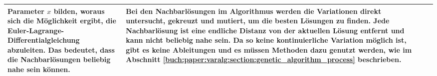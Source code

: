 \begin{xltabular}{\textwidth}{|L|X|X|}
   Parameter \(x\) bilden, woraus sich die Möglichkeit ergibt, die Euler-Lagrange-Differentialgleichung
   abzuleiten. Das bedeutet, dass die Nachbarlösungen beliebig nahe sein können.  
   & 
   Bei den Nachbarlösungen im Algorithmus werden die Variationen direkt untersucht,
   gekreuzt und mutiert, um die besten Lösungen zu finden. Jede Nachbarlösung 
   ist eine endliche Distanz von der aktuellen Lösung entfernt und kann nicht beliebig 
   nahe sein. Da so keine kontinuierliche Variation möglich ist, gibt es keine Ableitungen
   und es müssen Methoden dazu genutzt werden, wie im Abschnitt 
   \ref{buch:paper:varalg:section:genetic_algorithm_process} beschrieben.
   \\ \hline
   
\end{xltabular}